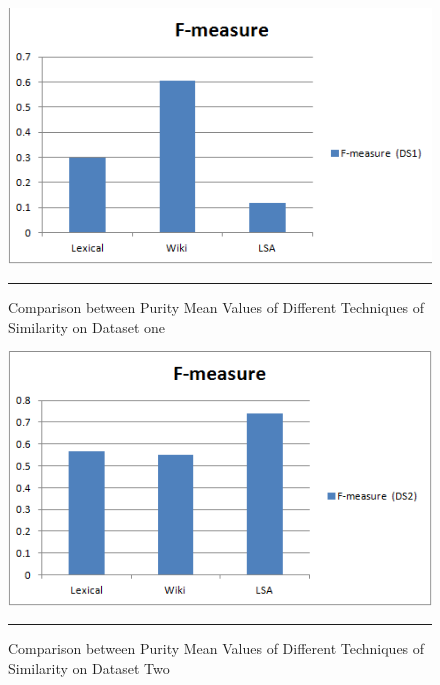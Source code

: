 \begin{figure}[htbp]
	\centering
		\includegraphics{./Figures/F_DS1.png}
		\rule{35em}{0.5pt}
	\caption[Comparison between Purity Mean Values of Different Techniques of Similarity on Dataset one]{Comparison between Purity Mean Values of Different Techniques of Similarity on Dataset one}
	\label{fig:F16}
\end{figure}
\begin{figure}[htbp]
	\centering
		\includegraphics{./Figures/F_DS2.png}
		\rule{35em}{0.5pt}
	\caption[Comparison between Purity Mean Values of Different Techniques of Similarity on Dataset Two]{Comparison between Purity Mean Values of Different Techniques of Similarity on Dataset Two}
	\label{fig:F30}
\end{figure}

